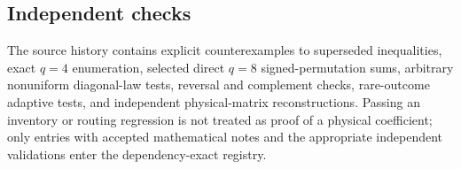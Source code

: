 \subsection{Independent checks}

The source history contains explicit counterexamples to superseded inequalities, exact $q=4$ enumeration, selected direct $q=8$ signed-permutation sums, arbitrary nonuniform diagonal-law tests, reversal and complement checks, rare-outcome adaptive tests, and independent physical-matrix reconstructions. Passing an inventory or routing regression is not treated as proof of a physical coefficient; only entries with accepted mathematical notes and the appropriate independent validations enter the dependency-exact registry.

